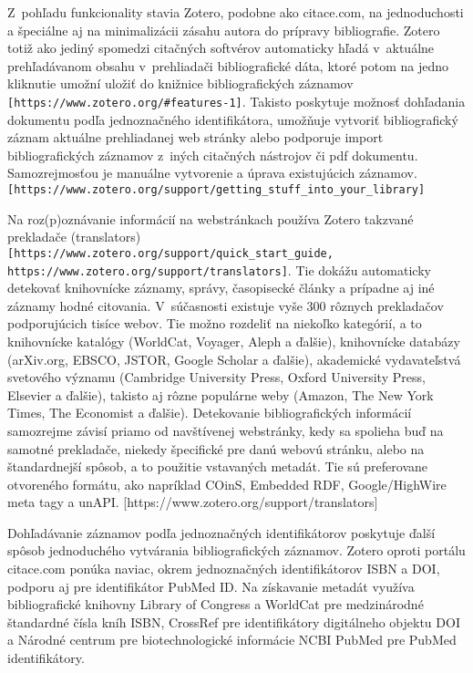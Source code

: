\documentclass{fithesis3}
\begin{document}
	Z~pohľadu funkcionality stavia Zotero, podobne ako citace.com, na jednoduchosti a špeciálne aj na minimalizácii zásahu autora do prípravy bibliografie. Zotero totiž ako jediný spomedzi citačných softvérov automaticky hľadá v~aktuálne prehľadávanom obsahu v~prehliadači bibliografické dáta, ktoré potom na jedno kliknutie umožní uložiť do knižnice bibliografických záznamov \verb+[https://www.zotero.org/#features-1]+. Takisto poskytuje možnosť dohľadania dokumentu podľa jednoznačného identifikátora, umožňuje vytvoriť bibliografický záznam aktuálne prehliadanej web stránky alebo podporuje import bibliografických záznamov z~iných citačných nástrojov či pdf dokumentu. Samozrejmosťou je manuálne vytvorenie a úprava existujúcich záznamov. \verb+[https://www.zotero.org/support/getting_stuff_into_your_library]+
	
	Na roz(p)oznávanie informácií na webstránkach používa Zotero takzvané prekladače (translators) \verb+[https://www.zotero.org/support/quick_start_guide, https://www.zotero.org/support/translators]+. Tie dokážu automaticky detekovať knihovnícke záznamy, správy, časopisecké články a prípadne aj iné záznamy hodné citovania. V~súčasnosti existuje vyše 300 rôznych prekladačov podporujúcich tisíce webov. Tie možno rozdeliť na niekoľko kategórií, a to knihovnícke katalógy (WorldCat, Voyager, Aleph a ďalšie), knihovnícke databázy (arXiv.org, EBSCO, JSTOR, Google Scholar a ďalšie), akademické vydavateľstvá svetového významu (Cambridge University Press, Oxford University Press, Elsevier a ďalšie), takisto aj rôzne populárne weby (Amazon, The New York Times, The Economist a ďalšie). Detekovanie bibliografických informácií samozrejme závisí priamo od navštívenej webstránky, kedy sa spolieha buď na samotné prekladače, niekedy špecifické pre danú webovú stránku, alebo na štandardnejší spôsob, a to použitie vstavaných metadát. Tie sú preferovane otvoreného formátu, ako napríklad COinS, Embedded RDF, Google/HighWire meta tagy a unAPI. [https://www.zotero.org/support/translators]
	
	Dohľadávanie záznamov podľa jednoznačných identifikátorov poskytuje ďalší spôsob jednoduchého vytvárania bibliografických záznamov. Zotero oproti portálu citace.com ponúka naviac, okrem jednoznačných identifikátorov ISBN a DOI, podporu aj pre identifikátor PubMed ID. Na získavanie metadát využíva bibliografické knihovny Library of Congress a WorldCat pre medzinárodné štandardné čísla kníh ISBN, CrossRef pre identifikátory digitálneho objektu DOI a Národné centrum pre biotechnologické informácie NCBI PubMed pre PubMed identifikátory.
	
\end{document}
